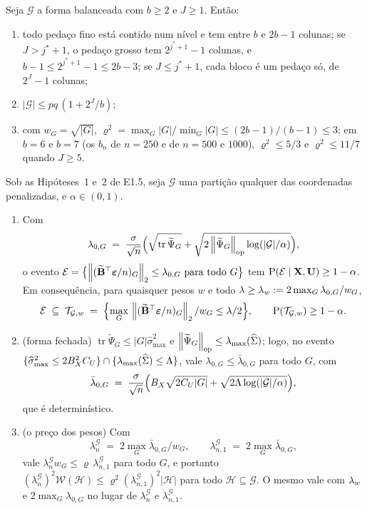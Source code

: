 \documentclass[11pt,a4paper]{article}
\newcommand{\lmaxx}{\lambda_{\max}}
\newcommand{\Bmat}{\mathbf{B}}
\newcommand{\Btil}{\widetilde{\Bmat}}
\newcommand{\bveps}{\boldsymbol{\varepsilon}}
\newcommand{\smax}{\widehat{\sigma}_{\max}}
\newcommand{\opnorm}[1]{\left\lVert #1 \right\rVert_{\mathrm{op}}}
\newcommand{\Gcal}{\mathcal{G}}
\newcommand{\Hcal}{\mathcal{H}}
\newcommand{\bn}{b_{n}}
\newcommand{\Psitil}{\widetilde{\Psi}}
\newcommand{\lamG}{\lambda^{\mathcal{G}}_{n}}
\newcommand{\lamGone}{\lambda^{\mathcal{G}}_{n,1}}
\newcommand{\lamz}[1]{\lambda_{0,#1}}
\newcommand{\lamzbar}[1]{\bar{\lambda}_{0,#1}}
\newcommand{\Tw}{\mathcal{T}_{\mathcal{G},w}}
\newcommand{\Ecal}{\mathcal{E}}
\newcommand{\jst}{j^{*}}
\begin{document}
\begin{proposition}\label{prop:balanceada}
Seja $\Gcal$ a forma balanceada com $b \ge 2$ e $J \ge 1$. Então:
\begin{enumerate}[label=\textup{(\roman*)}, leftmargin=*, nosep]
  \item todo pedaço fino está contido num nível e tem entre $b$ e $2b-1$
    colunas; se $J > \jst + 1$, o pedaço grosso tem $2^{\jst+1}-1$ colunas, e
    $b - 1 \le 2^{\jst+1}-1 \le 2b-3$; se $J \le \jst + 1$, cada bloco é um
    pedaço só, de $2^{J}-1$ colunas;
  \item $|\Gcal| \le pq\,(1 + 2^{J}/b)$;
  \item com $w_{G} = \sqrt{|G|}$, $\varrho^{2} = \max_{G}|G|/\min_{G}|G| \le
    (2b-1)/(b-1) \le 3$; em $b = 6$ e $b = 7$ (os $\bn$ de $n = 250$ e de
    $n = 500$ e $1000$), $\varrho^{2} \le 5/3$ e $\varrho^{2} \le 11/7$ quando
    $J \ge 5$.
\end{enumerate}
\end{proposition}

\begin{lemma}\label{lem:calib-blocos}
Sob as Hipóteses~1 e~2 de E1.5, seja $\Gcal$ uma partição qualquer das
coordenadas penalizadas, e $\alpha \in (0,1)$.
\begin{enumerate}[label=\textup{(\roman*)}, leftmargin=*]
  \item Com
    \[
      \lamz{G} \;=\; \frac{\sigma}{\sqrt n}\Bigl(\sqrt{\operatorname{tr}\Psitil_{G}}
      + \sqrt{2\opnorm{\Psitil_{G}}\log(|\Gcal|/\alpha)}\Bigr),
    \]
    o evento $\Ecal = \bigl\{\norm{(\Btil\T\bveps/n)_{G}}_{2} \le \lamz{G}
    \text{ para todo } G\bigr\}$ tem $\Prob(\Ecal \mid \bX,\bU) \ge 1 -
    \alpha$. Em consequência, para quaisquer pesos $w$ e todo
    $\pen \ge \pen_{w} := 2\max_{G}\lamz{G}/w_{G}$,
    \[
      \Ecal \;\subseteq\; \Tw \;=\; \Bigl\{\max_{G}\,
      \norm{(\Btil\T\bveps/n)_{G}}_{2}/w_{G} \le \pen/2\Bigr\},
      \qquad \Prob(\Tw) \ge 1 - \alpha .
    \]
  \item \textup{(forma fechada)} $\operatorname{tr}\Psitil_{G} \le
    |G|\smax^{2}$ e $\opnorm{\Psitil_{G}} \le \lmaxx(\Gramhat)$; logo, no
    evento $\{\smax^{2} \le 2B_{X}^{2}C_{U}\} \cap \{\lmaxx(\Gramhat) \le
    \Lambda\}$, vale $\lamz{G} \le \lamzbar{G}$ para todo $G$, com
    \[
      \lamzbar{G} \;=\; \frac{\sigma}{\sqrt n}\Bigl(B_{X}\sqrt{2C_{U}|G|}
      + \sqrt{2\Lambda\log(|\Gcal|/\alpha)}\Bigr),
    \]
    que é determinístico.
  \item \textup{(o preço dos pesos)} Com
    \[
      \lamG \;=\; 2\max_{G}\lamzbar{G}/w_{G},
      \qquad
      \lamGone \;=\; 2\max_{G}\lamzbar{G},
    \]
    vale $\lamG w_{G} \le \varrho\,\lamGone$ para todo $G$, e portanto
    $(\lamG)^{2}\mathcal{W}(\Hcal) \le \varrho^{2}(\lamGone)^{2}|\Hcal|$ para todo
    $\Hcal \subseteq \Gcal$. O mesmo vale com $\lambda_{w}$ e
    $2\max_{G}\lamz{G}$ no lugar de $\lamG$ e $\lamGone$.
\end{enumerate}
\end{lemma}
\end{document}
